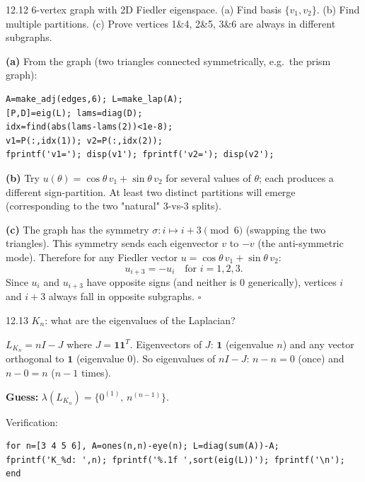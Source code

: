 \begin{exercise}{12.12}
6-vertex graph with 2D Fiedler eigenspace. (a) Find basis $\{v_1,v_2\}$. (b) Find multiple partitions. (c) Prove vertices 1\&4, 2\&5, 3\&6 are always in different subgraphs.
\end{exercise}
\begin{solution}
\textbf{(a)} From the graph (two triangles connected symmetrically, e.g.\ the prism graph):
\begin{lstlisting}
A=make_adj(edges,6); L=make_lap(A);
[P,D]=eig(L); lams=diag(D);
idx=find(abs(lams-lams(2))<1e-8);
v1=P(:,idx(1)); v2=P(:,idx(2));
fprintf('v1='); disp(v1'); fprintf('v2='); disp(v2');
\end{lstlisting}

\textbf{(b)} Try $u(\theta)=\cos\theta\,v_1+\sin\theta\,v_2$ for several values of $\theta$; each produces a different sign-partition. At least two distinct partitions will emerge (corresponding to the two "natural" 3-vs-3 splits).

\textbf{(c)} The graph has the symmetry $\sigma: i\mapsto i+3\pmod{6}$ (swapping the two triangles). This symmetry sends each eigenvector $v$ to $-v$ (the anti-symmetric mode). Therefore for any Fiedler vector $u=\cos\theta\,v_1+\sin\theta\,v_2$:
\[
u_{i+3}=-u_i\quad\text{for }i=1,2,3.
\]
Since $u_i$ and $u_{i+3}$ have opposite signs (and neither is 0 generically), vertices $i$ and $i+3$ always fall in opposite subgraphs. $\square$
\end{solution}

\begin{exercise}{12.13}
$K_n$: what are the eigenvalues of the Laplacian?
\end{exercise}
\begin{solution}
$L_{K_n}=nI-J$ where $J=\mathbf{1}\mathbf{1}^T$. Eigenvectors of $J$: $\mathbf{1}$ (eigenvalue $n$) and any vector orthogonal to $\mathbf{1}$ (eigenvalue 0). So eigenvalues of $nI-J$: $n-n=0$ (once) and $n-0=n$ ($n-1$ times).

\textbf{Guess:} $\lambda(L_{K_n})=\{0^{(1)},\,n^{(n-1)}\}$.

Verification:
\begin{lstlisting}
for n=[3 4 5 6], A=ones(n,n)-eye(n); L=diag(sum(A))-A;
fprintf('K_%d: ',n); fprintf('%.1f ',sort(eig(L))'); fprintf('\n'); end
\end{lstlisting}
\end{solution}

